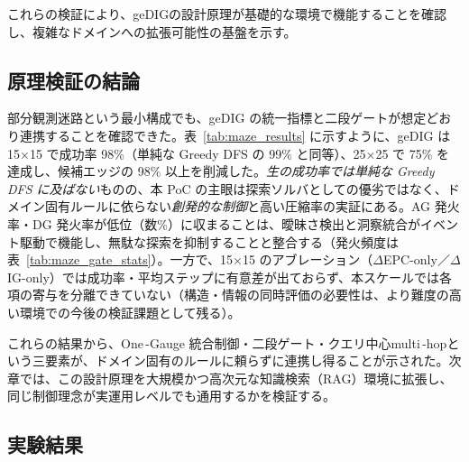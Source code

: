 \documentclass[ja=standard,xelatex]{bxjsarticle}
\begin{document}
これらの検証により、geDIGの設計原理が基礎的な環境で機能することを確認し、複雑なドメインへの拡張可能性の基盤を示す。

\subsection{原理検証の結論}

部分観測迷路という最小構成でも、geDIG の統一指標と二段ゲートが想定どおり連携することを確認できた。表~\ref{tab:maze_results} に示すように、geDIG は 15×15 で成功率 98\%（単純な Greedy DFS の 99\% と同等）、25×25 で 75\% を達成し、候補エッジの 98\% 以上を削減した。\emph{生の成功率では単純な Greedy DFS に及ばない}ものの、本 PoC の主眼は探索ソルバとしての優劣ではなく、ドメイン固有ルールに依らない\emph{創発的な制御}と高い圧縮率の実証にある。AG 発火率・DG 発火率が低位（数\%）に収まることは、曖昧さ検出と洞察統合がイベント駆動で機能し、無駄な探索を抑制することと整合する（発火頻度は表~\ref{tab:maze_gate_stats}）。一方で、15×15 のアブレーション（$\Delta$EPC-only／$\Delta$IG-only）では成功率・平均ステップに有意差が出ておらず、本スケールでは各項の寄与を分離できていない（構造・情報の同時評価の必要性は、より難度の高い環境での今後の検証課題として残る）。

これらの結果から、One\,\mbox{-}Gauge 統合制御・二段ゲート・クエリ中心multi\,\mbox{-}hopという三要素が、ドメイン固有のルールに頼らずに連携し得ることが示された。次章では、この設計原理を大規模かつ高次元な知識検索（RAG）環境に拡張し、同じ制御理念が実運用レベルでも通用するかを検証する。

\subsection{実験結果}
\end{document}
